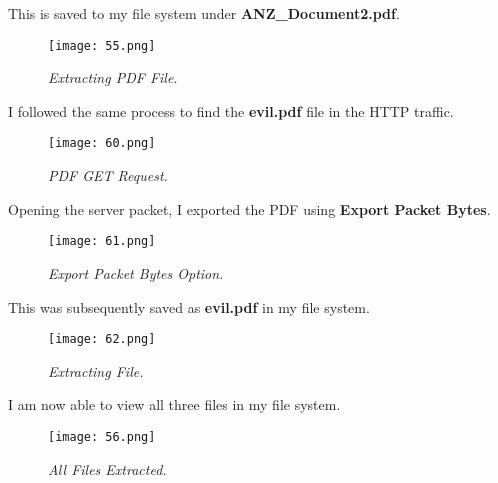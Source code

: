 This is saved to my file system under \textbf{ANZ\_Document2.pdf}.

\begin{figure}[H]
    \setlength{\abovecaptionskip}{20pt}
    \setlength{\belowcaptionskip}{0pt}
    \centering
    \texttt{[image: 55.png]}
    \captionsetup{justification=centering}
    \caption{\textit{Extracting PDF File.}}
    \label{fig:55}
\end{figure}
\vspace{-10pt}

I followed the same process to find the \textbf{evil.pdf} file in the HTTP traffic.

\begin{figure}[H]
    \setlength{\abovecaptionskip}{20pt}
    \setlength{\belowcaptionskip}{0pt}
    \centering
    \texttt{[image: 60.png]}
    \captionsetup{justification=centering}
    \caption{\textit{PDF GET Request.}}
    \label{fig:60}
\end{figure}
\vspace{-10pt}

Opening the server packet, I exported the PDF using \textbf{Export Packet Bytes}.

\begin{figure}[H]
    \setlength{\abovecaptionskip}{20pt}
    \setlength{\belowcaptionskip}{0pt}
    \centering
    \texttt{[image: 61.png]}
    \captionsetup{justification=centering}
    \caption{\textit{Export Packet Bytes Option.}}
    \label{fig:61}
\end{figure}
\vspace{-10pt}

This was subsequently saved as \textbf{evil.pdf} in my file system.

\begin{figure}[H]
    \setlength{\abovecaptionskip}{20pt}
    \setlength{\belowcaptionskip}{0pt}
    \centering
    \texttt{[image: 62.png]}
    \captionsetup{justification=centering}
    \caption{\textit{Extracting File.}}
    \label{fig:62}
\end{figure}
\vspace{-10pt}

I am now able to view all three files in my file system. 

\begin{figure}[H]
    \setlength{\abovecaptionskip}{20pt}
    \setlength{\belowcaptionskip}{0pt}
    \centering
    \texttt{[image: 56.png]}
    \captionsetup{justification=centering}
    \caption{\textit{All Files Extracted.}}
    \label{fig:56}
\end{figure}
\vspace{-10pt}

